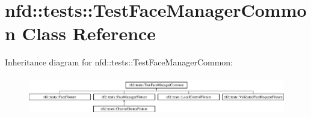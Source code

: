 \hypertarget{classnfd_1_1tests_1_1TestFaceManagerCommon}{}\section{nfd\+:\+:tests\+:\+:Test\+Face\+Manager\+Common Class Reference}
\label{classnfd_1_1tests_1_1TestFaceManagerCommon}
Inheritance diagram for nfd\+:\+:tests\+:\+:Test\+Face\+Manager\+Common\+:\begin{figure}[H]
\begin{center}
\leavevmode
\includegraphics[height=1.750000cm]{classnfd_1_1tests_1_1TestFaceManagerCommon}
\end{center}
\end{figure}
